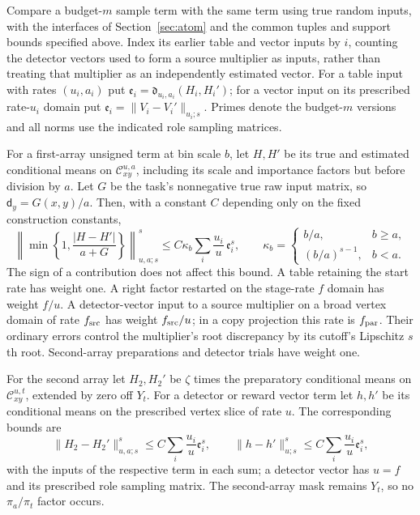 \begin{lemma}\label{lem:est-mean-comparison}
Compare a budget-$m$ sample term with the same term using true random
inputs, with the interfaces of Section~\ref{sec:atom} and the common
tuples and support bounds specified above. Index its earlier table and
vector inputs by $i$, counting the detector vectors used to form a source
multiplier as inputs, rather than treating that multiplier as an
independently estimated vector. For a table input with rates $(u_i,a_i)$ put
$\mathfrak e_i=\mathfrak d_{u_i,a_i}(H_i,H_i')$; for a vector input on
its prescribed rate-$u_i$ domain put
$\mathfrak e_i=\|V_i-V_i'\|_{u_i;s}$. Primes denote the budget-$m$
versions and all norms use the indicated role sampling matrices.

For a first-array unsigned term at bin scale $b$, let $H,H'$ be its
true and estimated conditional means on $\mathcal C_{xy}^{u,a}$,
including its scale and importance factors but before division by $a$.
Let $G$ be the task's nonnegative true raw input matrix, so $\mathsf{d}_y=G(x,y)/a$.
Then, with a constant $C$ depending only on the fixed construction constants,
\begin{equation}
 \left\|\min\left\{1,\frac{|H-H'|}{a+G}\right\}\right\|_{u,a;s}^s
 \le C\kappa_b\sum_i\frac{u_i}{u}\,\mathfrak e_i^s,
 \qquad
 \kappa_b=\begin{cases}
 b/a,&b\ge a,\\
 (b/a)^{s-1},&b<a.
 \end{cases}
 \label{eq:est-mean-comparison}
\end{equation}
The sign of a contribution does not affect this bound.
A table retaining the start rate has weight one. A right factor restarted
on the stage-rate $f$ domain has weight $f/u$. A detector-vector input
to a source multiplier on a broad vertex domain of rate $f_{\rm src}$
has weight $f_{\rm src}/u$; in a copy projection this rate is
$f_{\rm par}$. Their ordinary errors control the multiplier's root
discrepancy by its cutoff's Lipschitz $s$th root. Second-array preparations
and detector trials have weight one.

For the second array let $H_2,H_2'$ be $\zeta$ times the preparatory
conditional means on $\mathcal C_{xy}^{u,t}$, extended by zero off $Y_t$.
For a detector or reward vector term let $h,h'$ be its conditional means
on the prescribed vertex slice of rate $u$. The corresponding bounds are
\[
 \|H_2-H_2'\|_{u,a;s}^s
       \le C\sum_i\frac{u_i}{u}\mathfrak e_i^s,
 \qquad
 \|h-h'\|_{u;s}^s
       \le C\sum_i\frac{u_i}{u}\mathfrak e_i^s,
\]
with the inputs of the respective term in each sum; a detector vector
has $u=f$ and its prescribed role sampling matrix. The second-array mask
remains $Y_t$, so no $\pi_a/\pi_t$ factor occurs.
\end{lemma}
